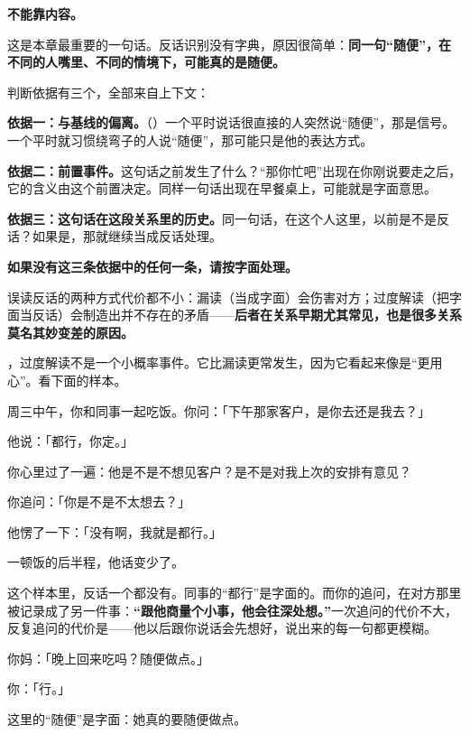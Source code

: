 \textbf{不能靠内容。}

这是本章最重要的一句话。反话识别没有字典，原因很简单：\textbf{同一句“随便”，在不同的人嘴里、不同的情境下，可能真的是随便。}

判断依据有三个，全部来自上下文：

\textbf{依据一：与基线的偏离。}（）一个平时说话很直接的人突然说“随便”，那是信号。一个平时就习惯绕弯子的人说“随便”，那可能只是他的表达方式。

\textbf{依据二：前置事件。}这句话之前发生了什么？“那你忙吧”出现在你刚说要走之后，它的含义由这个前置决定。同样一句话出现在早餐桌上，可能就是字面意思。

\textbf{依据三：这句话在这段关系里的历史。}同一句话，在这个人这里，以前是不是反话？如果是，那就继续当成反话处理。

\textbf{如果没有这三条依据中的任何一条，请按字面处理。}

误读反话的两种方式代价都不小：漏读（当成字面）会伤害对方；过度解读（把字面当反话）会制造出并不存在的矛盾——\textbf{后者在关系早期尤其常见，也是很多关系莫名其妙变差的原因。}

，过度解读不是一个小概率事件。它比漏读更常发生，因为它看起来像是“更用心”。看下面的样本。

\par
\begin{mdquote}
周三中午，你和同事一起吃饭。你问：「下午那家客户，是你去还是我去？」\par
他说：「都行，你定。」\par
你心里过了一遍：他是不是不想见客户？是不是对我上次的安排有意见？\par
你追问：「你是不是不太想去？」\par
他愣了一下：「没有啊，我就是都行。」\par
\vspace{0.3\baselineskip}
一顿饭的后半程，他话变少了。
\end{mdquote}

这个样本里，反话一个都没有。同事的“都行”是字面的。而你的追问，在对方那里被记录成了另一件事：\textbf{“跟他商量个小事，他会往深处想。”}一次追问的代价不大，反复追问的代价是——他以后跟你说话会先想好，说出来的每一句都更模糊。

\begin{mdquote}
你妈：「晚上回来吃吗？随便做点。」\par
你：「行。」\par
\vspace{0.3\baselineskip}
这里的“随便”是字面：她真的要随便做点。
\end{mdquote}

